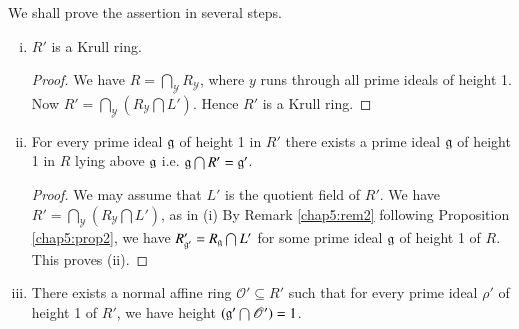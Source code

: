 We  shall prove  the  assertion in several  steps.
 \begin{enumerate}[(i)]
 \item $R'$ is a Krull ring.
   \begin{proof}
     We have $R = \bigcap \limits_{\mathscr{Y}}  R_{\mathscr{Y}}$,
     where $y$ runs through  all prime  ideals  of height 1.  
     Now $R' = \bigcap \limits _{\mathscr{Y}}  (R_{\mathscr{Y}}
     \bigcap L')$. Hence $R'$ is a Krull ring. 
   \end{proof}

 \item For  every prime ideal  $\mathfrak{g}$  of  height 1 in $R'$
   there exists a prime ideal $\mathfrak{g}$ of height  1 in  $R$
   lying above $\mathfrak{g}$ i.e. $\mathfrak{g}  \bigcap R' =
   \mathfrak{g}'$. 

   \begin{proof}
     We may assume  that  $L'$ is the  quotient field  of $R'$. We
     have  $R' = \bigcap\limits_{\mathscr{Y}} (R_{\mathscr{Y}} \bigcap
     L')$, as in  (i) By Remark \ref{chap5:rem2}  following  Proposition
     \ref{chap5:prop2}, we have 
     $R'_{\mathfrak{g}'} = R_{\mathfrak{g}} \bigcap L'$  for  some
     prime  ideal $\mathfrak{g}$  of  height  1  of $R$. 
      This proves  (ii).
   \end{proof}

 \item  There  exists a normal affine  ring  $\mathscr{O}' \subseteq
   R'$  such that  for every prime  ideal $\rho'$ of height 1
   of $R'$, we have  height  $(\mathfrak{g}' \bigcap  \mathscr{O}') = 1$.  
 

\end{enumerate}
